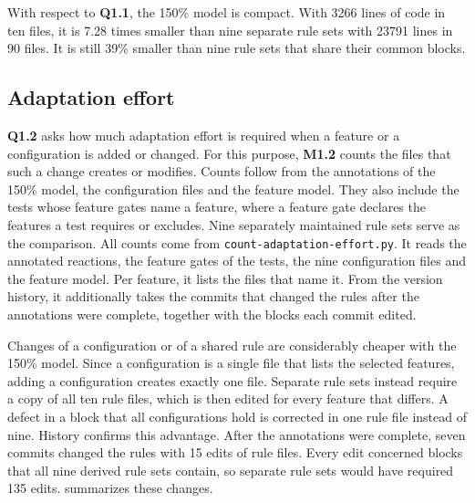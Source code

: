 With respect to \textbf{Q1.1}, the 150\% model is compact.
With 3266 lines of code in ten files, it is 7.28 times smaller than nine separate rule sets with 23791 lines in 90 files.
It is still 39\% smaller than nine rule sets that share their common blocks.

\subsection{Adaptation effort}
\label{sec:Evaluation:AnnotationMechanism:AdaptationEffort}

\textbf{Q1.2} asks how much adaptation effort is required when a feature or a configuration is added or changed.
For this purpose, \textbf{M1.2} counts the files that such a change creates or modifies.
Counts follow from the annotations of the 150\% model, the configuration files and the feature model.
They also include the tests whose feature gates name a feature, where a feature gate declares the features a test requires or excludes.
Nine separately maintained rule sets serve as the comparison.
All counts come from \texttt{count-adaptation-effort.py}.
It reads the annotated reactions, the feature gates of the tests, the nine configuration files and the feature model.
Per feature, it lists the files that name it.
From the version history, it additionally takes the commits that changed the rules after the annotations were complete, together with the blocks each commit edited.

Changes of a configuration or of a shared rule are considerably cheaper with the 150\% model.
Since a configuration is a single file that lists the selected features, adding a configuration creates exactly one file.
Separate rule sets instead require a copy of all ten rule files, which is then edited for every feature that differs.
A defect in a block that all configurations hold is corrected in one rule file instead of nine.
History confirms this advantage.
After the annotations were complete, seven commits changed the rules with 15 edits of rule files.
Every edit concerned blocks that all nine derived rule sets contain, so separate rule sets would have required 135 edits.
 summarizes these changes.

